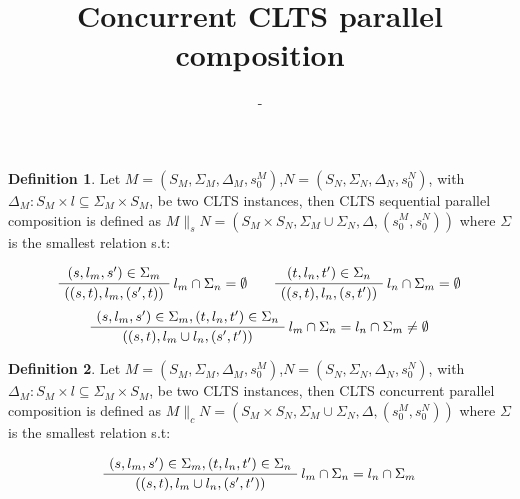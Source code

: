 \documentclass{article}
\title{Concurrent CLTS parallel composition} %
\author{-} %
\date{}
\theoremstyle{definition}
\newtheorem{definition}{Definition}[section]
\newcommand{\automaton}[1]{$#1 = (S_{#1}, \Sigma_{#1}, \Delta_{#1}, s_{0}^{#1})$}
\newcommand{\ltsComposition}[3]{$#1 \parallel_{#3} #2 = (S_{#1}\times S_{#2}, \Sigma_{#1} \cup \Sigma_{#2}, \Delta, (s_{0}^{#1},s_{0}^{#2}))$}
\begin{document}
\maketitle

\setcounter{section}{1} %
\setcounter{theorem}{1} %

\begin{definition} 
Let \automaton{M},\automaton{N}, with $\Delta_M : S_M \times l \subseteq \Sigma_M \times S_M$, be two CLTS instances, then CLTS sequential parallel composition is defined as \ltsComposition{M}{N}{s} where $\Sigma$ is the smallest relation s.t:
\begin{center}
	\begin{equation}
		\AxiomC{$(s, l_m, s') \in \Sigma_m $}\RightLabel{$l_m \cap \Sigma_n = \emptyset$}
		\UnaryInfC{$((s,t),l_m,(s',t))$}
		\DisplayProof
		\quad\quad
		\AxiomC{$(t, l_n, t') \in \Sigma_n $}\RightLabel{$l_n \cap \Sigma_m = \emptyset$}
		\UnaryInfC{$((s,t),l_n,(s,t'))$}
		\DisplayProof
	\end{equation}
	\begin{equation}
		\AxiomC{$(s, l_m, s') \in \Sigma_m,(t, l_n, t') \in \Sigma_n  $}\RightLabel{$l_m \cap \Sigma_n = l_n \cap \Sigma_m \neq \emptyset$}
		\UnaryInfC{$((s,t),l_m \cup l_n,(s',t'))$}
		\DisplayProof
	\end{equation}	
\end{center}
\end{definition}
\begin{definition} 
	Let \automaton{M},\automaton{N}, with $\Delta_M : S_M \times l \subseteq \Sigma_M \times S_M$, be two CLTS instances, then CLTS concurrent parallel composition is defined as \ltsComposition{M}{N}{c} where $\Sigma$ is the smallest relation s.t:
	\begin{center}
		\begin{equation}
		\AxiomC{$(s, l_m, s') \in \Sigma_m,(t, l_n, t') \in \Sigma_n  $}\RightLabel{$l_m \cap \Sigma_n = l_n \cap \Sigma_m$}
		\UnaryInfC{$((s,t),l_m \cup l_n,(s',t'))$}
		\DisplayProof
		\end{equation}	
	\end{center}
\end{definition}
\end{document}
